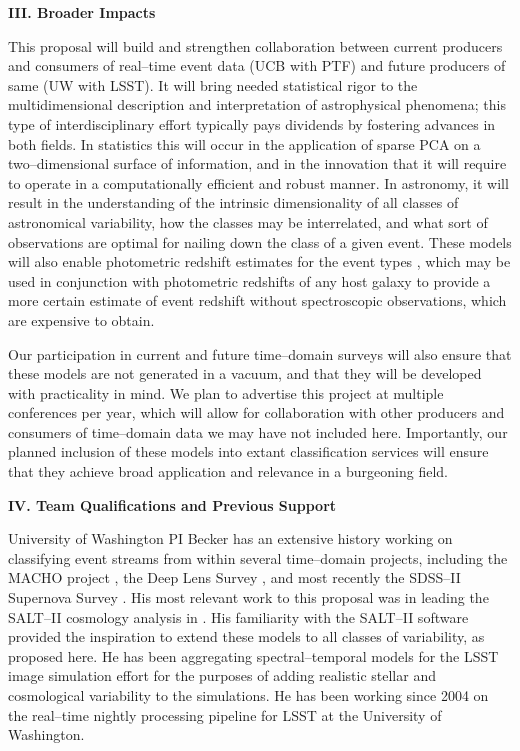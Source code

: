
\bigskip \centerline{\bf III. Broader Impacts} \smallskip

This proposal will build and strengthen collaboration between current producers
and consumers of real--time event data (UCB with PTF) and future producers of
same (UW with LSST).  It will bring needed statistical rigor to the
multidimensional description and interpretation of astrophysical phenomena; this
type of interdisciplinary effort typically pays dividends by fostering advances
in both fields.  In statistics this will occur in the application of sparse PCA
on a two--dimensional surface of information, and in the innovation that it will
require to operate in a computationally efficient and robust manner.  In
astronomy, it will result in the understanding of the intrinsic dimensionality
of all classes of astronomical variability, how the classes may be interrelated,
and what sort of observations are optimal for nailing down the class of a given
event.  These models will also enable photometric redshift estimates for the
event types \citep[e.g.][]{2010ApJ...717...40K}, which may be used in
conjunction with photometric redshifts of any host galaxy
\citep[e.g.][]{1962IAUS...15..390B} to provide a more certain estimate of event
redshift without spectroscopic observations, which are expensive to obtain.

Our participation in current and future time--domain surveys will also ensure
that these models are not generated in a vacuum, and that they will be developed
with practicality in mind.  We plan to advertise this project at multiple
conferences per year, which will allow for collaboration with other producers
and consumers of time--domain data we may have not included here. Importantly,
our planned inclusion of these models into extant classification services will
ensure that they achieve broad application and relevance in a burgeoning field.


\bigskip \centerline{\bf IV. Team Qualifications and Previous Support}
\smallskip

 \smallskip

University of Washington PI Becker has an extensive history working on classifying event streams from
within several time--domain projects, including the MACHO project
\citep{2000PhDT.......258B}, the Deep Lens Survey \citep{2004ApJ...611..418B},
and most recently the SDSS--II Supernova Survey
\citep{2008AJ....135..338F,2008AJ....135..348S}.  His most relevant work to this
proposal was in leading the SALT--II cosmology analysis in
\cite{2009ApJS..185...32K}.  His familiarity with the SALT--II software provided
the inspiration to extend these models to all classes of variability, as
proposed here. He has been aggregating spectral--temporal models for the LSST
image simulation effort \citep{2010SPIE.7738E..53C} for the purposes of adding
realistic stellar and cosmological variability to the simulations.  He has been
working since 2004 on the real--time nightly processing pipeline for LSST at the
University of Washington.

